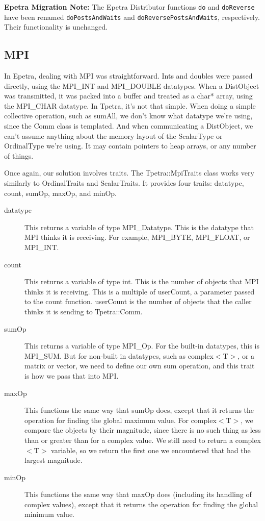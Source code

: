 \documentclass[10pt,relax]{TpetraDesign}
\begin{document}
\textbf{Epetra Migration Note:} The Epetra Distributor functions \texttt{do} and \texttt{doReverse} have been renamed \texttt{doPostsAndWaits} and \texttt{doReversePostsAndWaits}, respectively. Their functionality is unchanged.

%
\subsection{MPI}
In Epetra, dealing with MPI was straightforward. Ints and doubles were passed directly, using the MPI\_INT and MPI\_DOUBLE datatypes. When a DistObject was transmitted, it was packed into a buffer and treated as a char* array, using the MPI\_CHAR datatype. In Tpetra, it's not that simple. When doing a simple collective operation, such as sumAll, we don't know what datatype we're using, since the Comm class is templated. And when communicating a DistObject, we can't assume anything about the memory layout of the ScalarType or OrdinalType we're using. It may contain pointers to heap arrays, or any number of things.

Once again, our solution involves traits. The Tpetra::MpiTraits class works very similarly to OrdinalTraits and ScalarTraits. It provides four traits: datatype, count, sumOp, maxOp, and minOp.
\begin{description}

\item[datatype] This returns a variable of type MPI\_Datatype. This is the datatype that MPI thinks it is receiving. For example, MPI\_BYTE, MPI\_FLOAT, or MPI\_INT.

\item[count] This returns a variable of type int. This is the number of objects that MPI thinks it is receiving. This is a multiple of userCount, a parameter passed to the count function. userCount is the number of objects that the caller thinks it is sending to Tpetra::Comm.

\item[sumOp] This returns a variable of type MPI\_Op. For the built-in datatypes, this is MPI\_SUM. But for non-built in datatypes, such as complex$<$T$>$, or a matrix or vector, we need to define our own sum operation, and this trait is how we pass that into MPI.

\item[maxOp] This functions the same way that sumOp does, except that it returns the operation for finding the global maximum value. For complex$<$T$>$, we compare the objects by their magnitude, since there is no such thing as less than or greater than for a complex value. We still need to return a complex$<$T$>$ variable, so we return the first one we encountered that had the largest magnitude.

\item[minOp] This functions the same way that maxOp does (including its handling of complex values), except that it returns the operation for finding the global minimum value.
\end{description}
\end{document}

